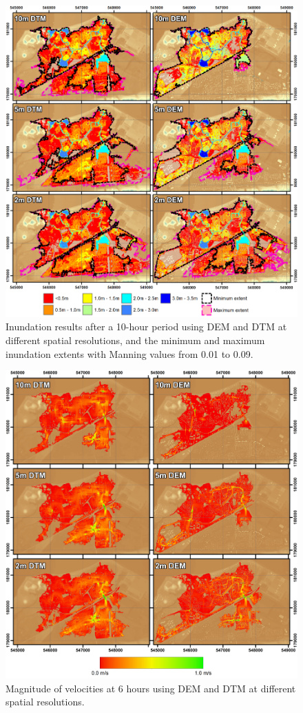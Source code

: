 \begin{figure}[p]
	\centering
	\includegraphics[width=1.0\textwidth]{heterogeneous-dev-figures/Thamesmead_AllDepths.png}
	\caption{Inundation results after a 10-hour period using DEM and DTM at different spatial resolutions, and the minimum and maximum inundation extents with Manning values from 0.01 to 0.09.}
	\label{Thamesmead_Inundation}
\end{figure}
\begin{figure}[p]
	\centering
	\includegraphics[width=1.0\textwidth]{heterogeneous-dev-figures/Thamesmead_AllVelocities.png}
	\caption{Magnitude of velocities at 6 hours using DEM and DTM at different spatial resolutions. }
	\label{Thamesmead_Velocities}
\end{figure}

